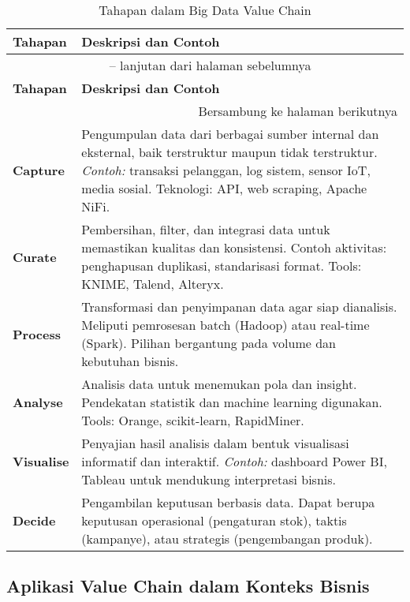 \begin{longtable}{|p{}|p{}|}
	\caption{Tahapan dalam Big Data Value Chain}
	\label{tab:big_data_value_chain} \\
	\hline
	\textbf{Tahapan} & \textbf{Deskripsi dan Contoh} \\
	\hline
	\endfirsthead
	
	\multicolumn{2}{c}{{\tablename\ \thetable{} -- lanjutan dari halaman sebelumnya}} \\
	\hline
	\textbf{Tahapan} & \textbf{Deskripsi dan Contoh} \\
	\hline
	\endhead
	
	\hline \multicolumn{2}{r}{{Bersambung ke halaman berikutnya}} \\
	\endfoot
	
	\hline
	\endlastfoot
	
	\textbf{Capture} &
	Pengumpulan data dari berbagai sumber internal dan eksternal, baik terstruktur maupun tidak terstruktur. \textit{Contoh:}  transaksi pelanggan, log sistem, sensor IoT, media sosial. Teknologi: API, web scraping, Apache NiFi. \\
	\hline
	\textbf{Curate} &
	Pembersihan, filter, dan integrasi data untuk memastikan kualitas dan konsistensi. Contoh aktivitas: penghapusan duplikasi, standarisasi format. Tools: KNIME, Talend, Alteryx. \\
	\hline
	\textbf{Process} &
	Transformasi dan penyimpanan data agar siap dianalisis. Meliputi pemrosesan batch (Hadoop) atau real-time (Spark). Pilihan bergantung pada volume dan kebutuhan bisnis. \\
	\hline
	\textbf{Analyse} &
	Analisis data untuk menemukan pola dan insight. Pendekatan statistik dan machine learning digunakan. Tools: Orange, scikit-learn, RapidMiner. \\
	\hline
	\textbf{Visualise} &
	Penyajian hasil analisis dalam bentuk visualisasi informatif dan interaktif. \textit{Contoh:}  dashboard Power BI, Tableau untuk mendukung interpretasi bisnis. \\
	\hline
	\textbf{Decide} &
	Pengambilan keputusan berbasis data. Dapat berupa keputusan operasional (pengaturan stok), taktis (kampanye), atau strategis (pengembangan produk). \\
	\hline
	
\end{longtable}


\subsection{Aplikasi Value Chain dalam Konteks Bisnis}

